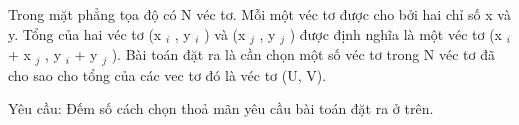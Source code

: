 Trong mặt phẳng tọa độ có N véc tơ. Mỗi một véc tơ được cho bởi hai chỉ số x và y. Tổng của hai véc tơ (x   $_    i   $   , y   $_    i   $   ) và (x   $_    j   $   , y   $_    j   $   ) được định nghĩa là một véc tơ (x   $_    i   $   + x   $_    j   $   , y   $_    i   $   + y   $_    j   $   ). Bài toán đặt ra là cần chọn một số véc tơ trong N véc tơ đã cho sao cho tổng của các vec tơ đó là véc tơ (U, V).  

   Yêu cầu: Đếm số cách chọn thoả mãn yêu cầu bài toán đặt ra ở trên.  

\
